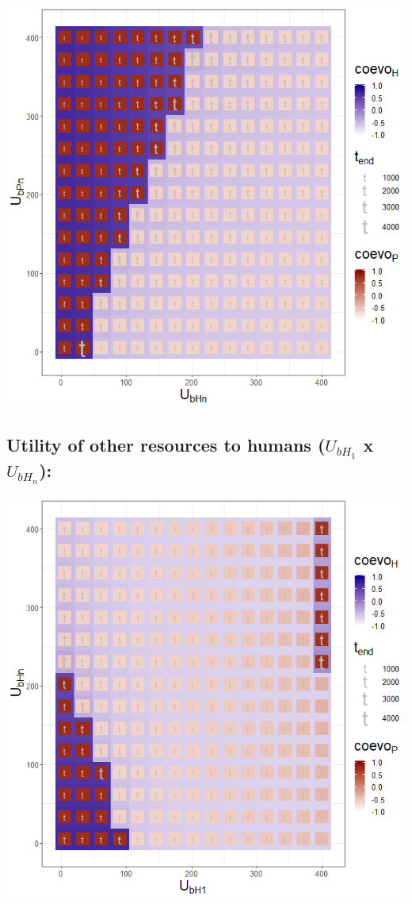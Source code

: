 \documentclass[]{book}
\begin{document}
\includegraphics[width=1\linewidth]{plots/3_twoPar-U.bHn-U.bPn_plot}

\newpage

\hypertarget{utility-of-other-resources-to-humans-u_bh_1-x-u_bh_n}{%
\subsection{\texorpdfstring{Utility of other resources to humans (\(U_{bH_{1}}\) x \(U_{bH_{n}}\)):}{Utility of other resources to humans (U\_\{bH\_\{1\}\} x U\_\{bH\_\{n\}\}):}}\label{utility-of-other-resources-to-humans-u_bh_1-x-u_bh_n}}

\includegraphics[width=1\linewidth]{plots/3_twoPar-U.bH1-U.bHn_plot}
\end{document}
